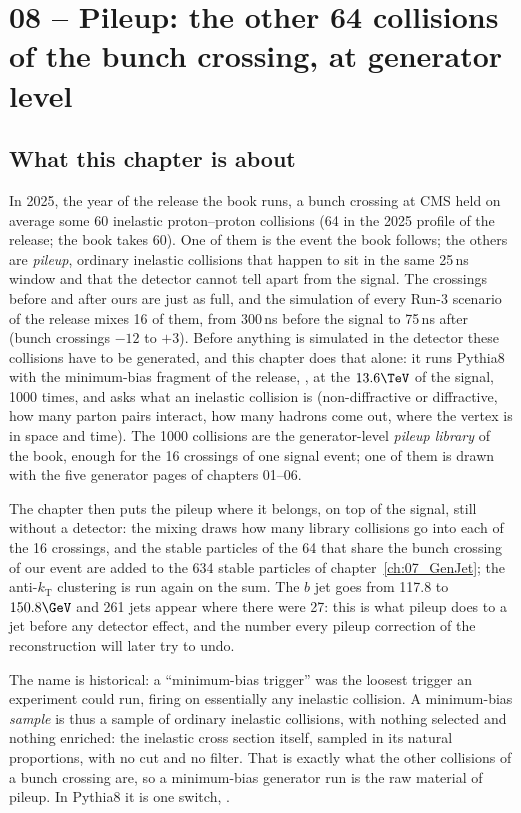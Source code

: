 \chapter{08 -- Pileup: the other 64 collisions of the bunch crossing, at generator level}
\label{ch:08_PU}

\section{What this chapter is about}

In 2025, the year of the release the book runs, a bunch crossing at CMS held on average some 60 inelastic
proton--proton collisions (64 in the 2025 profile of the release; the book takes 60). One of them is the \bbbar{} event the book follows; the others are \emph{pileup}, ordinary inelastic collisions
that happen to sit in the same 25\,ns window and that the detector cannot tell apart from the signal. The
crossings before and after ours are just as full, and the simulation of every Run-3 scenario of the release
mixes 16 of them, from 300\,ns before the signal to 75\,ns after (bunch crossings $-12$ to $+3$). Before
anything is simulated in the detector these collisions have to be generated, and this chapter does that
alone: it runs Pythia8 with the minimum-bias fragment of the release, ,
at the $13.6\TeV$ of the signal, 1000 times, and asks what an inelastic collision is (non-diffractive or
diffractive, how many parton pairs interact, how many hadrons come out, where the vertex is in space and
time). The 1000 collisions are the generator-level \emph{pileup library} of the book, enough for the 16
crossings of one signal event; one of them is drawn with the five generator pages of chapters 01--06.

The chapter then puts the pileup where it belongs, on top of the signal, still without a detector: the
mixing draws how many library collisions go into each of the 16 crossings, and the stable particles of the
64 that share the bunch crossing of our event are added to the 634 stable particles of chapter~\ref{ch:07_GenJet};
the anti-$k_{\mathrm{T}}$ clustering is run again on the sum. The $b$ jet goes from 117.8 to
$150.8\GeV$ and 261 jets appear where there were 27: this is what pileup does to a jet before any detector
effect, and the number every pileup correction of the reconstruction will later try to undo.

\begin{plainwords}
The name is historical: a ``minimum-bias trigger'' was the loosest trigger an experiment could run, firing
on essentially any inelastic collision. A minimum-bias \emph{sample} is thus a sample of ordinary inelastic
collisions, with nothing selected and nothing enriched: the inelastic cross section itself, sampled in its
natural proportions, with no \ptHat{} cut and no filter. That is exactly what the other collisions of a bunch
crossing are, so a minimum-bias generator run is the raw material of pileup. In Pythia8 it is one switch,
.
\end{plainwords}

